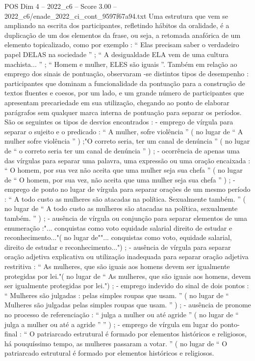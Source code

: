 \begin{textsample}{POS Dim 4 – 2022\_c6 – Score 3.00 – 2022\_c6/enade\_2022\_ci\_cont\_9597f67a94.txt}
Uma estrutura que vem se ampliando na escrita dos participantes, refletindo hábitos da oralidade, é a duplicação de um dos elementos da frase, ou seja, a retomada anafórica de um elemento topicalizado, como por exemplo : “ Elas precisam saber o verdadeiro papel DELAS na sociedade ” ; “ A desigualdade ELA vem de uma cultura machista... ” ; “ Homem e mulher, ELES são iguais ”.
Também em relação ao emprego dos sinais de pontuação, observaram -se distintos tipos de desempenho : participantes que dominam a funcionalidade da pontuação para a construção de textos fluentes e coesos, por um lado, e um grande número de participantes que apresentam precariedade em sua utilização, chegando ao ponto de elaborar parágrafos sem qualquer marca interna de pontuação para separar os períodos.
São os seguintes os tipos de desvios encontrados : - emprego de vírgula para separar o sujeito e o predicado : “ A mulher, sofre violência ” ( no lugar de “ A mulher sofre violência ” ) ;"O correto seria, ter um canal de denúncia ” ( no lugar de “ o correto seria ter um canal de denúncia ” ) ; - ocorrência de apenas uma das vírgulas para separar uma palavra, uma expressão ou uma oração encaixada : “ O homem, por sua vez não aceita que uma mulher seja sua chefa ” ( no lugar de “ O homem, por sua vez, não aceita que uma mulher seja sua chefa ” ) ; - emprego de ponto no lugar de vírgula para separar orações de um mesmo período : “ A todo custo as mulheres são atacadas na política.
Sexualmente também. ” ( no lugar de “ A todo custo as mulheres são atacadas na política, sexualmente também. ” ) ; - ausência de vírgula ou conjunção para separar elementos de uma enumeração :"... conquistas como voto equidade salarial direito de estudar e reconhecimento..."( no lugar de""... conquistas como voto, equidade salarial, direito de estudar e reconhecimento...") ; - ausência de vírgula para separar oração adjetiva explicativa ou utilização inadequada para separar oração adjetiva restritiva : “ As mulheres, que são iguais aos homens devem ser igualmente protegidas por lei."( no lugar de “ As mulheres, que são iguais aos homens, devem ser igualmente protegidas por lei.") ; - emprego indevido do sinal de dois pontos : “ Mulheres são julgadas : pelas simples roupas que usam. ” ( no lugar de “ Mulheres são julgadas pelas simples roupas que usam. ” ) ; - ausência de pronome no processo de referenciação : “ julga a mulher ou até agride ” ( no lugar de “ julga a mulher ou até a agride ” ” ) ; - emprego de vírgula em lugar do ponto-final : “ O patriarcado estrutural é formado por elementos históricos e religiosos, há pouquíssimo tempo, as mulheres passaram a votar. ” ( no lugar de “ O patriarcado estrutural é formado por elementos históricos e religiosos.

\end{textsample}
